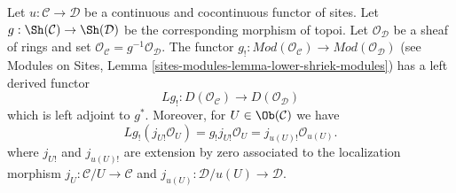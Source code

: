 \begin{lemma}
\label{lemma-existence-derived-lower-shriek}
Let $u : \mathcal{C} \to \mathcal{D}$ be a continuous and cocontinuous
functor of sites. Let $g : \Sh(\mathcal{C}) \to \Sh(\mathcal{D})$ be the
corresponding morphism of topoi. Let $\mathcal{O}_\mathcal{D}$
be a sheaf of rings and set
$\mathcal{O}_\mathcal{C} = g^{-1}\mathcal{O}_\mathcal{D}$.
The functor $g_! : \textit{Mod}(\mathcal{O}_\mathcal{C}) \to
\textit{Mod}(\mathcal{O}_\mathcal{D})$
(see
Modules on Sites, Lemma \ref{sites-modules-lemma-lower-shriek-modules})
has a left derived functor
$$
Lg_! : D(\mathcal{O}_\mathcal{C}) \longrightarrow D(\mathcal{O}_\mathcal{D})
$$
which is left adjoint to $g^*$. Moreover, for $U \in \Ob(\mathcal{C})$ we
have
$$
Lg_!(j_{U!}\mathcal{O}_U) =
g_!j_{U!}\mathcal{O}_U =
j_{u(U)!} \mathcal{O}_{u(U)}.
$$
where $j_{U!}$ and $j_{u(U)!}$ are extension by zero associated to the
localization morphism
$j_U : \mathcal{C}/U \to \mathcal{C}$ and
$j_{u(U)} : \mathcal{D}/u(U) \to \mathcal{D}$.
\end{lemma}

